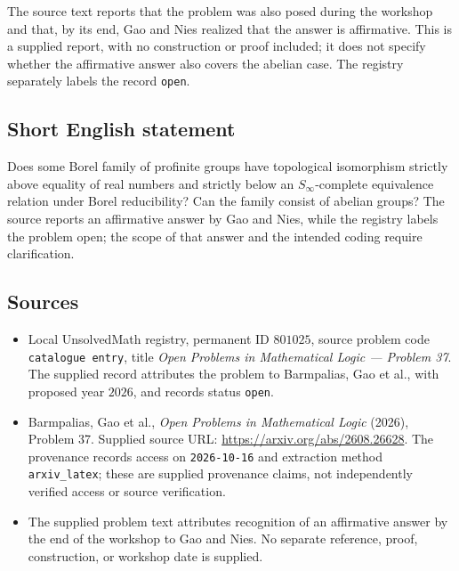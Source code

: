 \documentclass[11pt]{article}
\begin{document}
The source text reports that the problem was also posed during the workshop and that, by its end, Gao and Nies realized that the answer is affirmative. This is a supplied report, with no construction or proof included; it does not specify whether the affirmative answer also covers the abelian case. The registry separately labels the record \texttt{open}.
\subsection{Short English statement}
Does some Borel family of profinite groups have topological isomorphism strictly above equality of real numbers and strictly below an \(S_\infty\)-complete equivalence relation under Borel reducibility? Can the family consist of abelian groups? The source reports an affirmative answer by Gao and Nies, while the registry labels the problem open; the scope of that answer and the intended coding require clarification.
\subsection{Sources}
\begin{itemize}
\item Local UnsolvedMath registry, permanent ID \(801025\), source problem code \texttt{catalogue entry}, title \emph{Open Problems in Mathematical Logic --- Problem 37}. The supplied record attributes the problem to Barmpalias, Gao et al., with proposed year \(2026\), and records status \texttt{open}.
\item Barmpalias, Gao et al., \emph{Open Problems in Mathematical Logic} (2026), Problem 37. Supplied source URL: \url{https://arxiv.org/abs/2608.26628}. The provenance records access on \texttt{2026-10-16} and extraction method \texttt{arxiv\_latex}; these are supplied provenance claims, not independently verified access or source verification.
\item The supplied problem text attributes recognition of an affirmative answer by the end of the workshop to Gao and Nies. No separate reference, proof, construction, or workshop date is supplied.
\end{itemize}
\end{document}
